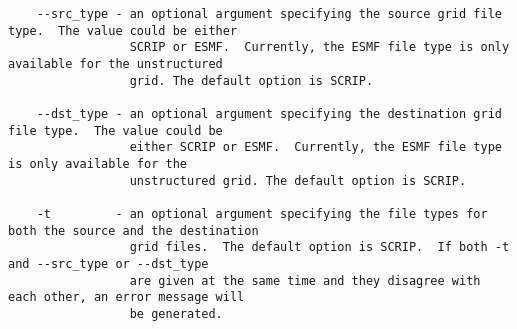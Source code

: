 \begin{verbatim}
    --src_type - an optional argument specifying the source grid file type.  The value could be either
                 SCRIP or ESMF.  Currently, the ESMF file type is only available for the unstructured 
                 grid. The default option is SCRIP.

    --dst_type - an optional argument specifying the destination grid file type.  The value could be 
                 either SCRIP or ESMF.  Currently, the ESMF file type is only available for the
                 unstructured grid. The default option is SCRIP.

    -t         - an optional argument specifying the file types for both the source and the destination
                 grid files.  The default option is SCRIP.  If both -t and --src_type or --dst_type
                 are given at the same time and they disagree with each other, an error message will
                 be generated.
\end{verbatim}

